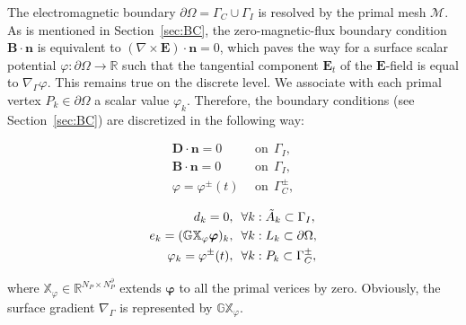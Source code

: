 \documentclass{article}
\begin{document}
The electromagnetic boundary $\partial\Omega = \Gamma_C\cup \Gamma_I$ is resolved by the
primal mesh $\mathcal{M}$. As is mentioned in Section~\ref{sec:BC}, the zero-magnetic-flux
boundary condition $\mathbf{B}\cdot \mathbf{n}$ is equivalent to
$(\nabla\times\mathbf{E}) \cdot \mathbf{n} = 0$, which paves the way for a surface scalar
potential $\varphi:\partial\Omega\to\mathbb{R}$ such that the tangential component
$\mathbf{E}_t$ of the $\mathbf{E}$-field is equal to $\nabla_\Gamma\varphi$. This remains
true on the discrete level. We associate with each primal vertex $P_k \in \partial\Omega$
a scalar value $\varphi_k$. Therefore, the boundary conditions (see Section~\ref{sec:BC})
are discretized in the following way:
\begin{center}
    \vspace{-0.5cm}
    \begin{minipage}{0.3\textwidth}
    \begin{align*}
    \mathbf{D} \cdot \mathbf{n} = 0\ \ &\text{on} \ \  \Gamma_I,  \\
    \mathbf{B} \cdot \mathbf{n} = 0\ \  &\text{on} \ \  \Gamma_I, \\
    \varphi = \varphi^\pm(t)\ \ &\text{on} \ \ \Gamma_C^\pm,
    \end{align*}
    \end{minipage}
    \begin{minipage}{0.1\textwidth}
    \centering
    \end{minipage}
    \begin{minipage}{0.5\textwidth}
        \centering
        \begin{subequations}
            \begin{align}
            d_k = 0,\ \ &\forall k : \Tilde{A}_k \subset \Gamma_I,\label{equ:bc_3} \\
            e_k = (\mathbb{GX}_\varphi\bm{\varphi})_k,\ \ &\forall k : L_k \subset \partial\Omega, \label{equ:bc_2}\\
            \varphi_k = \varphi^\pm(t), \ \ &\forall k : P_k \subset \Gamma_C^\pm, \label{equ:bc_1}
            \end{align}
        \end{subequations}
    \end{minipage}
\end{center}
where $\mathbb{X}_\varphi \in \mathbb{R}^{N_P \times N_P^\partial}$ extends $\bm{\varphi}$
to all the primal verices by zero. Obviously, the surface gradient $\nabla_\Gamma$ is
represented by $\mathbb{GX}_\varphi$.
\end{document}
